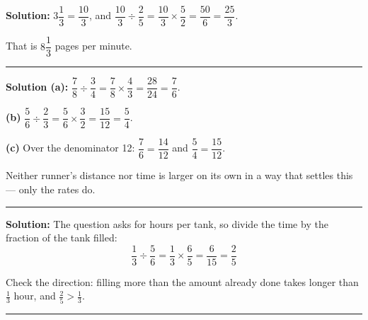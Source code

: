 \documentclass[12pt]{article}
\begin{document}

\textbf{Solution:} $3\dfrac{1}{3} = \dfrac{10}{3}$, and $\dfrac{10}{3} \div \dfrac{2}{5} = \dfrac{10}{3} \times \dfrac{5}{2} = \dfrac{50}{6} = \dfrac{25}{3}$. 

That is $8\dfrac{1}{3}$ pages per minute.

\vspace{0.15cm}\noindent\rule{\linewidth}{0.2pt}\vspace{0.15cm}


\textbf{Solution (a):} $\dfrac{7}{8} \div \dfrac{3}{4} = \dfrac{7}{8} \times \dfrac{4}{3} = \dfrac{28}{24} = \dfrac{7}{6}$. 

\textbf{(b)} $\dfrac{5}{6} \div \dfrac{2}{3} = \dfrac{5}{6} \times \dfrac{3}{2} = \dfrac{15}{12} = \dfrac{5}{4}$. 

\textbf{(c)} Over the denominator 12: $\dfrac{7}{6} = \dfrac{14}{12}$ and $\dfrac{5}{4} = \dfrac{15}{12}$. 

Neither runner's distance nor time is larger on its own in a way that settles this --- only the rates do.

\vspace{0.15cm}\noindent\rule{\linewidth}{0.2pt}\vspace{0.15cm}


\textbf{Solution:} The question asks for hours per tank, so divide the time by the fraction of the tank filled:
\[ \frac{1}{3} \div \frac{5}{6} = \frac{1}{3} \times \frac{6}{5} = \frac{6}{15} = \frac{2}{5} \]

Check the direction: filling more than the amount already done takes longer than $\frac{1}{3}$ hour, and $\frac{2}{5} > \frac{1}{3}$.

\vspace{0.15cm}\noindent\rule{\linewidth}{0.2pt}\vspace{0.15cm}

\end{document}
